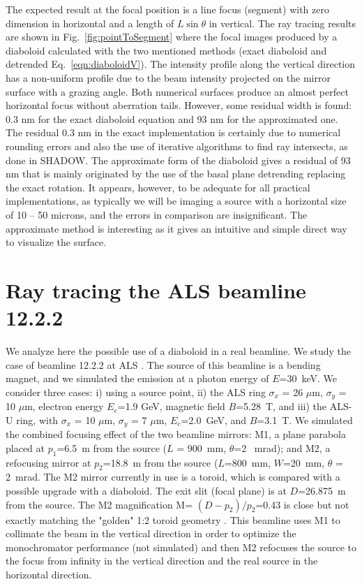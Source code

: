 \documentclass{iucr}              %
\begin{document}
The expected result at the focal position is a line focus (segment) with zero dimension in horizontal and a length of $L\sin\theta$ in vertical. The ray tracing results are shown in Fig.~\ref{fig:pointToSegment} where the focal images produced by a diaboloid calculated with the two mentioned methods (exact diaboloid and detrended Eq.~\ref{eqn:diaboloidV}).
The intensity profile along the vertical direction has a non-uniform profile due to the beam intensity projected on the mirror surface with a grazing angle.
Both numerical surfaces produce an almost perfect horizontal focus without aberration tails. However, some residual width is found: 0.3 nm for the exact diaboloid equation and 93 nm for the approximated one. 
The residual 0.3 nm in the exact implementation is certainly due to numerical rounding errors and also the use of iterative algorithms to find ray intersects, as done in SHADOW.
The approximate form of the diaboloid gives a residual of 93 nm that is mainly originated by the use of the basal plane detrending replacing the exact rotation. It appears, however, to be adequate for all practical implementations, as typically we will be imaging a source with a horizontal size of 10 – 50 microns, and the errors in comparison are insignificant. The approximate method is interesting as it gives an intuitive and simple direct way to visualize the surface.

\section{Ray tracing the ALS beamline 12.2.2}
\label{sec:beamline}

We analyze here the possible use of a diaboloid in a real beamline. We study the case of beamline 12.2.2  at ALS \cite{bl1222} \cite{MacDowell2004}. The source of this beamline is a bending magnet, and we simulated the emission at a photon energy of $E$=30~keV. We consider three cases: i) using a source point, ii) the ALS ring
$\sigma_x$ = 26 $\mu$m, $\sigma_y$ = 10 $\mu$m, electron energy $E_e$=1.9 GeV, magnetic field $B$=5.28~T, and iii) the ALS-U ring, with $\sigma_x$ = 10 $\mu$m, $\sigma_y$ = 7 $\mu$m, $E_e$=2.0~GeV, and $B$=3.1~T. We simulated the combined focusing effect of the two beamline mirrors: M1, a plane parabola placed at $p_1$=6.5~m from the source ($L$ = 900~mm, $\theta$=2 ~mrad); and M2, a refocusing mirror at $p_2$=18.8~m from the source ($L$=800~mm, $W$=20~mm, $\theta$ = 2~mrad. The M2 mirror currently in use is a toroid, which is compared with a possible upgrade with a diaboloid. The exit slit (focal plane) is at $D$=26.875~m from the source.  The M2 magnification M= $(D-p_2)/p_2$=0.43 is close but not exactly matching the "golden" 1:2 toroid geometry \cite{MacDowell2004}. This beamline uses M1 to collimate the beam in the vertical direction in order to optimize the monochromator performance (not simulated) and then 
M2 refocuses the source to the focus from infinity in the vertical direction and the real source in the horizontal direction.
\end{document}
